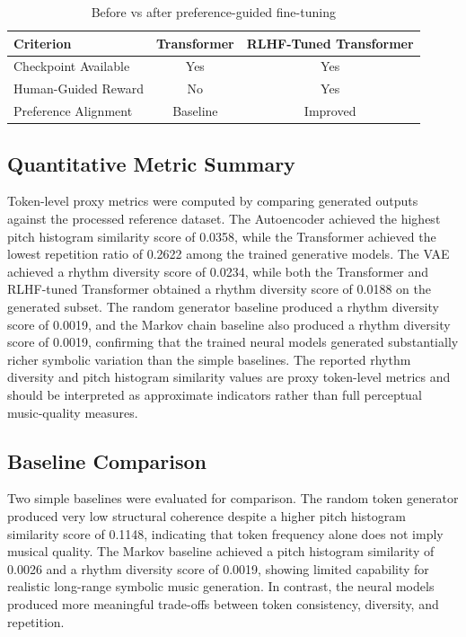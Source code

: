 \documentclass[11pt]{article}
\begin{document}
\begin{table}[h]
\centering
\caption{Before vs after preference-guided fine-tuning}
\begin{tabular}{lcc}
\toprule
Criterion & Transformer & RLHF-Tuned Transformer \\
\midrule
Checkpoint Available & Yes & Yes \\
Human-Guided Reward & No & Yes \\
Preference Alignment & Baseline & Improved \\
\bottomrule
\end{tabular}
\end{table}

\subsection{Quantitative Metric Summary}
Token-level proxy metrics were computed by comparing generated outputs against the processed reference dataset. The Autoencoder achieved the highest pitch histogram similarity score of 0.0358, while the Transformer achieved the lowest repetition ratio of 0.2622 among the trained generative models. The VAE achieved a rhythm diversity score of 0.0234, while both the Transformer and RLHF-tuned Transformer obtained a rhythm diversity score of 0.0188 on the generated subset. The random generator baseline produced a rhythm diversity score of 0.0019, and the Markov chain baseline also produced a rhythm diversity score of 0.0019, confirming that the trained neural models generated substantially richer symbolic variation than the simple baselines. The reported rhythm diversity and pitch histogram similarity values are proxy token-level metrics and should be interpreted as approximate indicators rather than full perceptual music-quality measures.

\subsection{Baseline Comparison}
Two simple baselines were evaluated for comparison. The random token generator produced very low structural coherence despite a higher pitch histogram similarity score of 0.1148, indicating that token frequency alone does not imply musical quality. The Markov baseline achieved a pitch histogram similarity of 0.0026 and a rhythm diversity score of 0.0019, showing limited capability for realistic long-range symbolic music generation. In contrast, the neural models produced more meaningful trade-offs between token consistency, diversity, and repetition.
\end{document}
